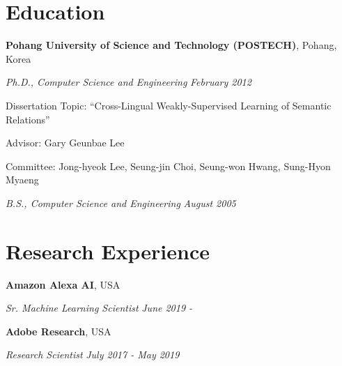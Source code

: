 \documentclass[margin,line]{res}
\newenvironment{list1}{
  \begin{list}{\ding{113}}{%
      \setlength{\itemsep}{0in}
      \setlength{\parsep}{0in} \setlength{\parskip}{0in}
      \setlength{\topsep}{0in} \setlength{\partopsep}{0in}
      \setlength{\leftmargin}{0.17in}}}{\end{list}}
\begin{document}
\begin{resume}
\section{\sc Education}
{\bf Pohang University of Science and Technology (POSTECH)}, Pohang, Korea\\
\vspace*{-.3cm}
\begin{list1}
\item[] {\em Ph.D., Computer Science and Engineering} \hfill {\em February 2012}\\
  \vspace*{-.3cm}
  \begin{list1}
  \item [] Dissertation Topic:  ``Cross-Lingual Weakly-Supervised Learning of Semantic Relations''
  \item [] Advisor:  Gary Geunbae Lee
  \item [] Committee: Jong-hyeok Lee, Seung-jin Choi, Seung-won Hwang, Sung-Hyon Myaeng
  \end{list1}
  \vspace*{.3cm}
\item[] {\em B.S., Computer Science and Engineering} \hfill {\em August 2005}\\
  \vspace*{-.3cm}
\end{list1}

\section{\sc Research Experience}
{\bf Amazon Alexa AI}, USA\\
\vspace{-.3cm}
\begin{list1}
\item[] {\em Sr. Machine Learning Scientist} \hfill {\em June 2019 -}\\
  \vspace{-.3cm}
\end{list1}

{\bf Adobe Research}, USA\\
\vspace{-.3cm}
\begin{list1}
\item[] {\em Research Scientist} \hfill {\em July 2017 - May 2019}\\
  \vspace{-.3cm}
\end{list1}


\end{resume}
\end{document}
